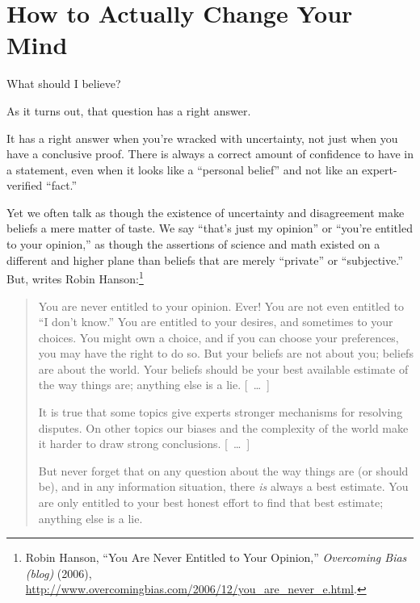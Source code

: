 \part{How to Actually Change Your Mind}




{
 What should I believe?}

{
 As it turns out, that question has a right answer.}

{
 It has a right answer when you're wracked with
uncertainty, not just when you have a conclusive proof. There is always
a correct amount of confidence to have in a statement, even when it
looks like a ``personal belief'' and
not like an expert-verified
``fact.''}

{
 Yet we often talk as though the existence of uncertainty and
disagreement make beliefs a mere matter of taste. We say
``that's just my
opinion'' or
``you're entitled to your
opinion,'' as though the assertions of science and
math existed on a different and higher plane than beliefs that are
merely ``private'' or
``subjective.'' But, writes Robin
Hanson:\footnote{Robin Hanson, ``You Are Never Entitled to Your
Opinion,'' \textit{Overcoming Bias (blog)} (2006),
\url{http://www.overcomingbias.com/2006/12/you\_are\_never\_e.html}.}}

\begin{quotation}
{
 You are never entitled to your opinion. Ever! You are not even
entitled to ``I don't
know.'' You are entitled to your desires, and
sometimes to your choices. You might own a choice, and if you can
choose your preferences, you may have the right to do so. But your
beliefs are not about you; beliefs are about the world. Your beliefs
should be your best available estimate of the way things are; anything
else is a lie. [~\ldots~]}

{
 It is true that some topics give experts stronger mechanisms for
resolving disputes. On other topics our biases and the complexity of
the world make it harder to draw strong conclusions. [~\ldots~]}

{
 But never forget that on any question about the way things are (or
should be), and in any information situation, there \textit{is} always
a best estimate. You are only entitled to your best honest effort to
find that best estimate; anything else is a lie.}
\end{quotation}

